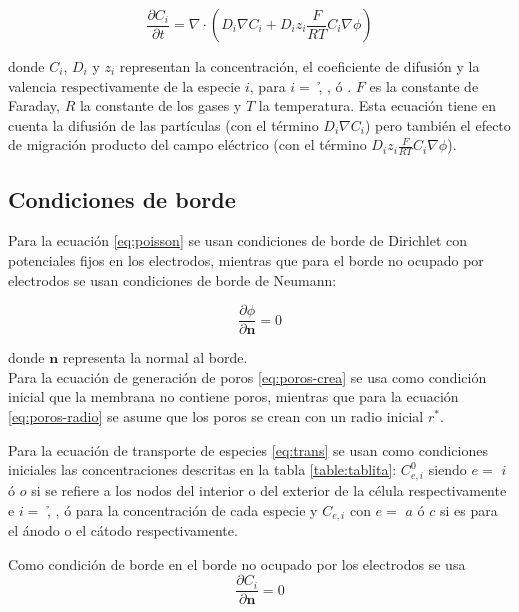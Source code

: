 \begin{equation} \label{eq:trans}
	\frac{\partial C_i}{\partial t} = \nabla \cdot \left( D_i \nabla C_i + D_i z_i \frac{F}{R T} C_i \nabla \phi \right)
\end{equation}

donde $C_i$, $D_i$ y $z_i$ representan la concentración, el coeficiente de difusión y la valencia respectivamente de la especie $i$, para $i = $ \h, \oh, \na ó \cl.
$F$ es la constante de Faraday, $R$ la constante de los gases y $T$ la temperatura. 
Esta ecuación tiene en cuenta la difusión de las partículas (con el término $D_i \nabla C_i$) pero también el efecto de migración producto del campo eléctrico (con el término $D_i z_i \frac{F}{R T} C_i \nabla \phi$). 

\subsection*{Condiciones de borde}
Para la ecuación \ref{eq:poisson} se usan condiciones de borde de Dirichlet con potenciales fijos en los electrodos, mientras que para el borde no ocupado por electrodos se usan condiciones de borde de Neumann:

\begin{equation}
	\frac{\partial \phi}{\partial \mathbf{n}} = 0
\end{equation}

donde $\mathbf{n}$ representa la normal al borde.\\

Para la ecuación de generación de poros \ref{eq:poros-crea} se usa como condición inicial que la membrana no contiene poros, mientras que para la ecuación \ref{eq:poros-radio} se asume que los poros se crean con un radio inicial $r^*$.

Para la ecuación de transporte de especies \ref{eq:trans} se usan como condiciones iniciales las concentraciones descritas en la tabla \ref{table:tablita}: $C_{e, i}^0$ siendo $e =$ $i$ ó $o$ si se refiere a los nodos del interior o del exterior de la célula respectivamente e $i =$ \h, \oh, \na ó \cl para la concentración de cada especie y $C_{e,i}$ con $e =$ $a$ ó $c$ si es para el ánodo o el cátodo respectivamente.

Como condición de borde en el borde no ocupado por los electrodos se usa
\begin{equation}
	\frac{\partial C_i}{\partial \mathbf{n}} = 0
\end{equation}

